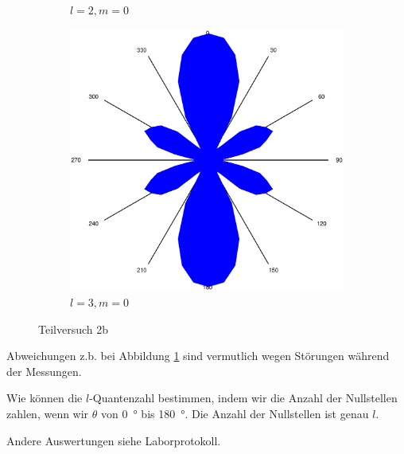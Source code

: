 \begin{figure}[!ht]
\begin{subfigure}{0.3\textwidth}
				\caption{$l = 2, m=0$}
				\label{fig:tv2b-2}
			\end{subfigure}
			\begin{subfigure}{0.3\textwidth}
				\centering
				\includegraphics[width=\textwidth]{images/tv2b-180deg-peak3-angle.eps}
				\caption{$l = 3, m=0$}
				\label{fig:tv2b-3}
			\end{subfigure}
		    \caption{Teilversuch 2b}
		\end{figure}
		Abweichungen z.b. bei Abbildung \ref{fig:tv2b-2} sind vermutlich wegen Störungen während der Messungen.

		Wie können die $l$-Quantenzahl bestimmen, indem wir die Anzahl der Nullstellen zahlen, wenn wir $\theta$ von \SI{0}{\degree} bis \SI{180}{\degree}. Die Anzahl der Nullstellen ist genau $l$.

		Andere Auswertungen siehe Laborprotokoll.



	
